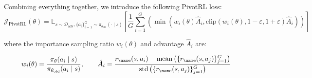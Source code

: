Combining everything together, we introduce the following PivotRL loss:
\begin{equation}
\mathcal{J}_{\text{PivotRL}}(\theta) = \mathbb{E}_{s \sim \mathcal{D}_{\text{adv}}, \{a_i\}_{i=1}^G \sim \pi_{\theta_{\text{old}}}(\cdot \mid s)} \left[ \frac{1}{G} \sum_{i=1}^G \left( \min \left( w_i(\theta) \hat{A}_i, \text{clip}(w_i(\theta), 1-\varepsilon, 1+\varepsilon) \hat{A}_i \right) \right) \right]
\label{eq:pivotrl_loss}
\end{equation}

\noindent where the importance sampling ratio $w_i(\theta)$ and advantage $\hat{A}_i$ are:

\begin{equation}
w_i(\theta) = \frac{\pi_\theta(a_i \mid s)}{\pi_{\theta_{\text{old}}}(a_i \mid s)}, \qquad \hat{A}_i = \frac{r_{\name}(s, a_i) - \text{mean}\left(\{r_{\name}(s, a_j)\}_{j=1}^G\right)}{\text{std}\left(\{r_{\name}(s, a_j)\}_{j=1}^G\right)}
\label{eq:pivot_definitions}
\end{equation}